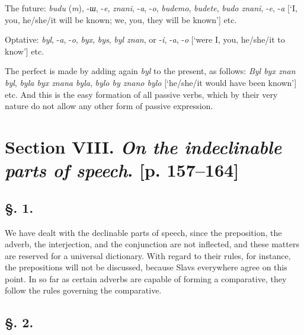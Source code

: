 The future: \textit{budu} (\textit{m}), -\textit{ш}, -\textit{e}, \textit{znani}, -\textit{a}, -\textit{o}, \textit{budemo}, \textit{budete}, \textit{budo znani}, -\textit{e}, -\textit{a} [‘I, you, he/she/it will be known; we, you, they will be known’] etc.

Optative: \textit{byl}, -\textit{a}, -\textit{o}, \textit{byx}, \textit{bys}, \textit{byl znan}, or -\textit{i}, -\textit{a}, -\textit{o} [‘were I, you, he/she/it to know’] etc.

The perfect is made by adding again \textit{byl} to the present, as follows: \textit{Byl byx znan byl}, \textit{byla byx znana byla}, \textit{bylo by znano bylo} [‘he/she/it would have been known’] etc. And this is the easy formation of all passive verbs, which by their very nature do not allow any other form of passive expression.

\section*{Section VIII. \textit{On the indeclinable parts of speech}. \linebreak{}[p. 157--164]}

\subsection*{\hspace*{\fill}§. 1.\hspace*{\fill}}

We have dealt with the declinable parts of speech, since the preposition, the adverb, the interjection, and the conjunction are not inflected, and these matters are reserved for a universal dictionary. With regard to their rules, for instance, the prepositions will not be discussed, because Slavs everywhere agree on this point. In so far as certain adverbs are capable of forming a comparative, they follow the rules governing the comparative.

\subsection*{\hspace*{\fill}§. 2.\hspace*{\fill}}

